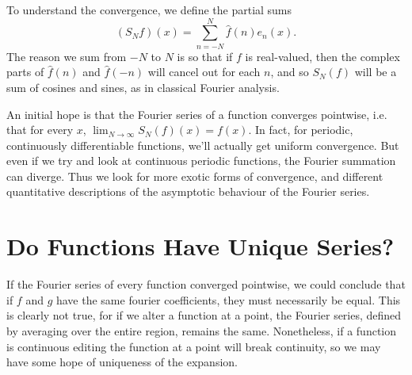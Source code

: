 To understand the convergence, we define the partial sums
%
\[ (S_Nf)(x) = \sum_{n = -N}^N \widehat{f}(n) e_n(x). \]
%
The reason we sum from $-N$ to $N$ is so that if $f$ is real-valued, then the complex parts of $\widehat{f}(n)$ and $\widehat{f}(-n)$ will cancel out for each $n$, and so $S_N(f)$ will be a sum of cosines and sines, as in classical Fourier analysis.

An initial hope is that the Fourier series of a function converges pointwise, i.e. that for every $x$, $\lim_{N \to \infty} S_N(f)(x) = f(x)$. In fact, for periodic, continuously differentiable functions, we'll 
actually get uniform convergence. But even if we try and look at continuous periodic functions, the Fourier summation can diverge. Thus we look for more exotic forms of convergence, and different quantitative descriptions of the asymptotic behaviour of the Fourier series.

\section{Do Functions Have Unique Series?}

If the Fourier series of every function converged pointwise, we could conclude that if $f$ and $g$ have the same fourier coefficients, they must necessarily be equal. This is clearly not true, for if we alter a function at a point, the Fourier series, defined by averaging over the entire region, remains the same. Nonetheless, if a function is continuous editing the function at a point will break continuity, so we may have some hope of uniqueness of the expansion.

